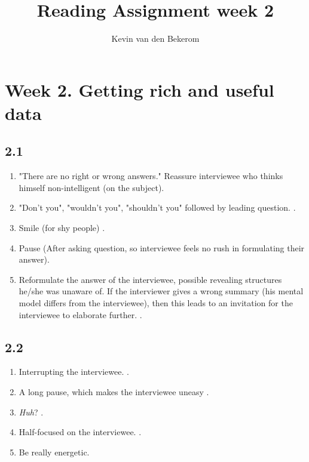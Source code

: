 

\title{Reading Assignment week 2}
\newcommand{\TitelAbbr}{}
\newcommand{\Version}{0.1}



\what{}
\supervisors{}
\author{Kevin van den Bekerom}




\maketitle

\clearpage

\chapter*{Week 2. Getting rich and useful data}

\section*{2.1}

\begin{enumerate}
	\item "There are no right or wrong answers." Reassure interviewee who thinks himself non-intelligent (on the subject).  \cite{nisha}
	\item "Don't you", "wouldn't you", "shouldn't you" followed by leading question. \cite{nisha}.
	\item Smile (for shy people) \cite{nisha}.
	\item Pause (After asking question, so interviewee feels no rush in formulating their answer). \cite{nisha}
	\item Reformulate the answer of the interviewee, possible revealing structures he/she was unaware of. If the interviewer gives a wrong summary (his mental model differs from the interviewee), then this leads to an invitation for the interviewee to elaborate further.  \cite{apprenticing}.
\end{enumerate}

\section*{2.2}

\begin{enumerate}
	\item Interrupting the interviewee. \cite{medical}.
	\item A long pause, which makes the interviewee uneasy \cite{nisha}.
	\item \textit{Huh}?  \cite{apprenticing}.
	\item Half-focused on the interviewee. \cite{medical}.
	\item Be really energetic. \cite{nisha} 
\end{enumerate}

